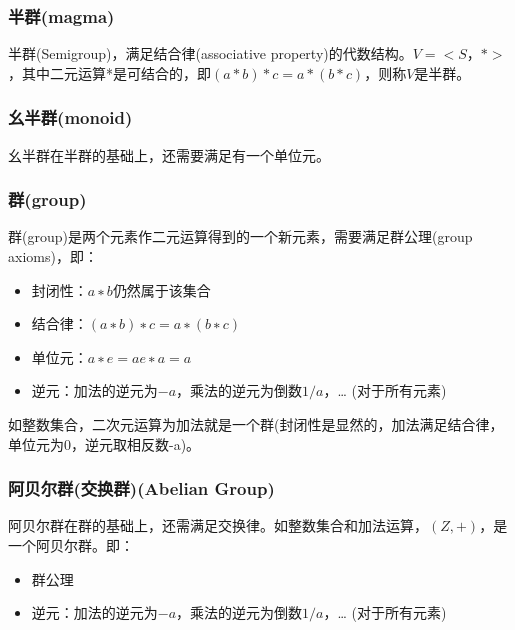 \documentclass[12pt]{article}
\begin{document}
\subsubsection{半群(magma)}
半群(Semigroup)，满足结合律(associative property)的代数结构。$V=<S，* >$，其中二元运算*是可结合的，即$(a*b)*c=a*(b*c)$，则称$V$是半群。

\subsubsection{幺半群(monoid)}
幺半群在半群的基础上，还需要满足有一个单位元。

\subsubsection{群(group)}
群(group)是两个元素作二元运算得到的一个新元素，需要满足群公理(group axioms)，即：
\begin{itemize}
\setlength{\itemsep}{0pt}
\setlength{\parsep}{0pt}
\setlength{\parskip}{0pt}
\item 封闭性：$a ∗ b$仍然属于该集合
\item 结合律：$(a ∗ b) ∗ c = a ∗ (b ∗ c)$
\item 单位元：$a ∗ e = a  e ∗ a = a$
\item 逆元：加法的逆元为$-a$，乘法的逆元为倒数$1/a$，… (对于所有元素)
\end{itemize}

如整数集合，二次元运算为加法就是一个群(封闭性是显然的，加法满足结合律，单位元为0，逆元取相反数-a)。

\subsubsection{阿贝尔群(交换群)(Abelian Group)}
阿贝尔群在群的基础上，还需满足交换律。如整数集合和加法运算，$(Z,+)$，是一个阿贝尔群。即：
\begin{itemize}
\setlength{\itemsep}{0pt}
\setlength{\parsep}{0pt}
\setlength{\parskip}{0pt}
\item 群公理
\item 逆元：加法的逆元为$-a$，乘法的逆元为倒数$1/a$，… (对于所有元素)
\end{itemize}
\end{document}
